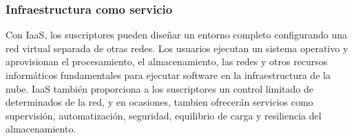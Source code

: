 \subsubsection{Infraestructura como servicio}
Con IaaS, los suscriptores pueden diseñar un entorno completo configurando una red virtual separada de otras redes. Los usuarios ejecutan un sistema operativo y aprovisionan el procesamiento, el almacenamiento, las redes y otros recursos informáticos fundamentales para ejecutar software en la infraestructura de la nube. IaaS también proporciona a los suscriptores un control limitado de determinados de la red, y en ocasiones, tambien ofrecerán servicios como supervisión, automatización, seguridad, equilibrio de carga y resiliencia del almacenamiento.